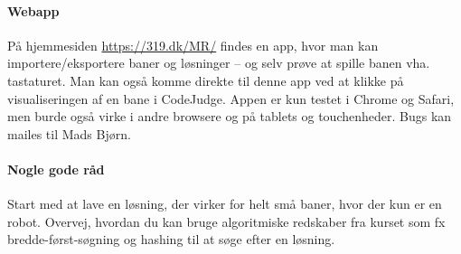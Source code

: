 \documentclass[10pt, a4paper]{article}
\begin{document}
\paragraph{Webapp} På hjemmesiden \url{https://319.dk/MR/} findes en app, hvor man kan importere/eksportere baner og løsninger -- og selv prøve at spille banen vha. tastaturet. Man kan også komme direkte til denne app ved at klikke på visualiseringen af en bane i CodeJudge. Appen er kun testet i Chrome og Safari, men burde også virke i andre browsere og på tablets og touchenheder. Bugs kan mailes til Mads Bjørn.

\paragraph{Nogle gode råd} Start med at lave en løsning, der virker for helt små baner, hvor der kun er en robot. Overvej, hvordan du kan bruge algoritmiske redskaber fra kurset som fx bredde-først-søgning og hashing til at søge efter en løsning.
\end{document}
